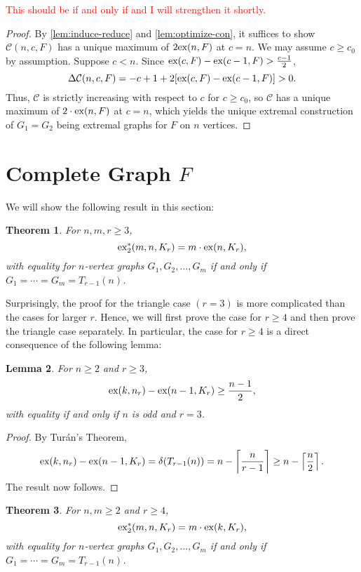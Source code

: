 \documentclass[12pt]{report}
\newtheorem{theorem}{Theorem}[chapter]
\newtheorem{lemma}[theorem]{Lemma}
\newcommand*{\ex}{\textnormal{ex}}
\newcommand*{\dex}{\textnormal{ex}_2}
\newcommand*{\con}{\mathcal{C}}
\begin{document}
\textcolor{red}{This should be if and only if and I will strengthen it shortly.}

\begin{proof}
  By \cref{lem:induce-reduce} and \cref{lem:optimize-con}, it suffices to show $\con(n, c, F)$ has a unique maximum of $2\ex(n, F)$ at $c = n$. We may assume $c \geq c_0$ by assumption. Suppose $c < n$. Since $\ex(c, F) - \ex(c - 1, F) > \frac{c - 1}{2}$,
  \[
    \Delta \con(n, c, F) = - c + 1 + 2[\ex(c, F) - \ex(c - 1, F)] > 0.
  \]
  Thus, $\con$ is strictly increasing with respect to $c$ for $c \geq c_0$, so $\con$ has a unique maximum of $2 \cdot \ex(n, F)$ at $c = n$, which yields the unique extremal construction of $G_1 = G_2$ being extremal graphs for $F$ on $n$ vertices.
\end{proof}

\section{Complete Graph $F$}

We will show the following result in this section:

\begin{theorem}\label{thm:induce-complete}
  For $n, m, r \geq 3$, 
  \[
    \dex^*(m, n, K_{r}) = m \cdot \ex(n, K_{r}),
  \]
  with equality for $n$-vertex graphs $G_1, G_2, \ldots, G_m$ if and only if $G_1 = \cdots = G_m = T_{r - 1}(n)$.
\end{theorem}

Surprisingly, the proof for the triangle case $(r = 3)$ is more complicated than the cases for larger $r$. Hence, we will first prove the case for $r \geq 4$ and then prove the triangle case separately. In particular, the case for $r \geq 4$ is a direct consequence of the following lemma:

\begin{lemma}\label{lem:induce-complete-cond}
  For $n \geq 2$ and $r \geq 3$,
  \[
    \ex(k, n_{r}) - \ex(n - 1, K_{r}) \geq \frac{n - 1}{2},
  \]
  with equality if and only if $n$ is odd and $r = 3$.
\end{lemma}

\begin{proof}
  By Turán's Theorem,
  \[
    \ex(k, n_{r}) - \ex(n - 1, K_{r}) = \delta(T_{r - 1}(n)) = n - \left\lceil \frac{n}{r - 1} \right\rceil \geq n - \left\lceil\frac{n}{2}\right\rceil.
  \]
  The result now follows.
\end{proof}

\begin{theorem}\label{thm:induce-complete-no-triangle}
  For $n, m \geq 2$ and $r \geq 4$, 
  \[
    \dex^*(m, n, K_{r}) = m \cdot \ex(k, K_{r}),
  \]
  with equality for $n$-vertex graphs $G_1, G_2, \ldots, G_m$ if and only if $G_1 = \cdots = G_m = T_{r - 1}(n)$.
\end{theorem}
\end{document}
